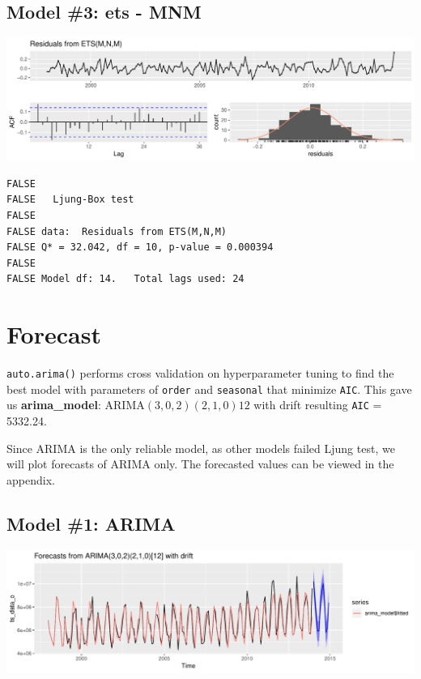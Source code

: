 \documentclass[openany]{book}
\begin{document}
\subsection{Model \#3: ets - MNM}\label{model-3-ets---mnm}

\includegraphics{Part-B-AS_files/figure-latex/unnamed-chunk-7-1.pdf}

\begin{verbatim}
FALSE 
FALSE   Ljung-Box test
FALSE 
FALSE data:  Residuals from ETS(M,N,M)
FALSE Q* = 32.042, df = 10, p-value = 0.000394
FALSE 
FALSE Model df: 14.   Total lags used: 24
\end{verbatim}

\section*{Forecast}\label{b-forecast}

\texttt{auto.arima()} performs cross validation on hyperparameter tuning
to find the best model with parameters of \texttt{order} and
\texttt{seasonal} that minimize \texttt{AIC}. This gave us
\textbf{arima\_model}: ARIMA\((3,0,2)(2,1,0)12\) with drift resulting
\texttt{AIC} = 5332.24.

Since ARIMA is the only reliable model, as other models failed Ljung
test, we will plot forecasts of ARIMA only. The forecasted values can be
viewed in the appendix.

\subsection{Model \#1: ARIMA}\label{model-1-arima-1}

\includegraphics{Part-B-AS_files/figure-latex/unnamed-chunk-8-1.pdf}
\end{document}
